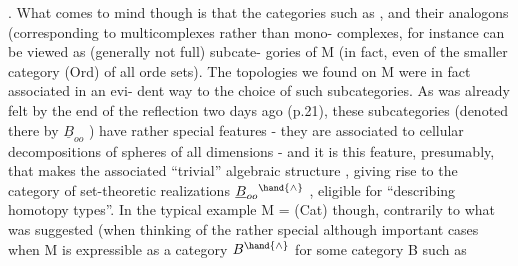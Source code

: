 .  What comes to mind though is that the categories such as \hand{$\Delta$} , \hand{$\square$}
and their analogons (corresponding to multicomplexes rather than mono-%
complexes, for instance\over{\unsure{,}}{)}  can be viewed as (generally not full) subcate-%
gories of M  (in fact,  even of the smaller category (Ord) of all orde
sets).  The topologies we found on M were in fact associated in an evi-%
dent way to the choice of such subcategories.  As was already felt by
the end of the reflection two days ago (p.21),  these subcategories
(denoted there by $\underline{B}_{oo}$  ) have rather special features  -  they are
associated to  cellular decompositions of spheres of all dimensions  -
and it is this feature,  presumably,  that makes the associated ``trivial''
algebraic structure , giving rise to the category of set-theoretic
realizations  $\underline{B}_{oo}{}^{\hand{\wedge}}$ ,  eligible for ``describing homotopy types''.  In the
typical example M = (Cat) though,  contrarily to what was suggested 
  (when thinking  of the rather special although important cases
when M is expressible  as a category  $B^{\hand{\wedge}}$\hand{,} for some category B such as
